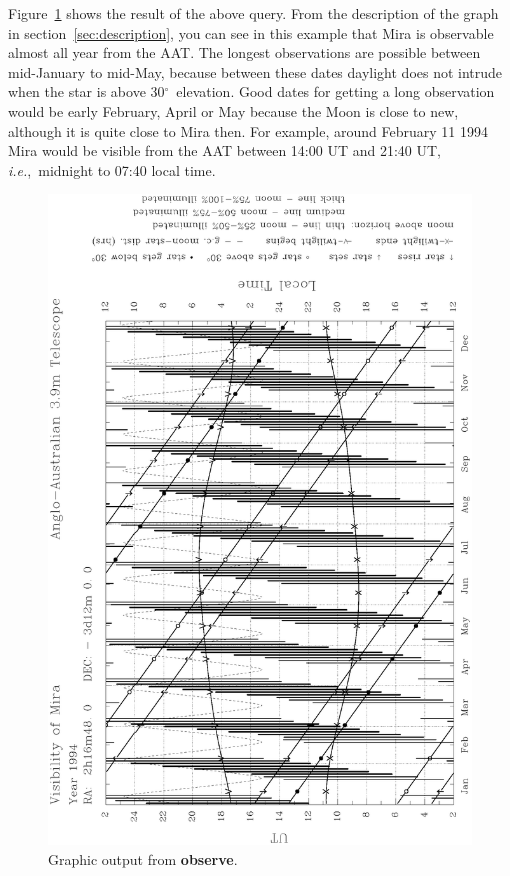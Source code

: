 \documentclass[11pt]{article}
\newcommand{\xlabel}[1]{}
\newcommand{\degrees}{\hbox{$^\circ$}}
\newcommand{\degrees}{{\rawhtml &deg;}}
\begin{document}
Figure~\ref{fig_output} shows the result of the above query.
From the description of the graph in section~\ref{sec:description},
you can see in this example that Mira is observable almost all year
from the AAT.  The longest observations are possible between
mid-January to mid-May, because  between these dates daylight does not
intrude when the star is above 30\degrees\ elevation. Good dates for
getting a long observation would be early February, April or May
because the Moon is close to new, although it is quite close to Mira
then.  For example, around February 11 1994 Mira would be visible from
the AAT between 14:00 UT and 21:40 UT, {\em{i.e.}},~midnight to 07:40
local time.

\newpage

\begin{figure}
\begin{center}
\includegraphics{sun146_fig.eps}
\vspace{5mm}
\caption{Graphic output from {\bf{observe}}.}
\label{fig_output}
\xlabel{fig_output}
\end{center}
\end{figure}
\end{document}
